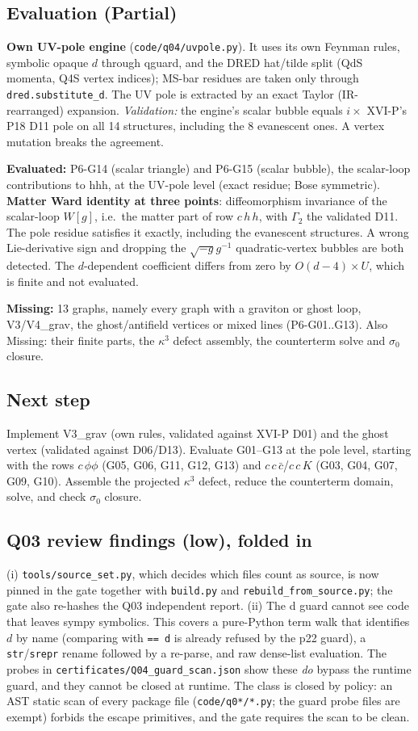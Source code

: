 \subsection{Evaluation (Partial)}
\textbf{Own UV-pole engine} (\texttt{code/q04/uvpole.py}). It uses its own Feynman rules, symbolic opaque $d$ through
qguard, and the DRED hat/tilde split (QdS momenta, Q4S vertex indices); MS-bar residues are taken only through
\texttt{dred.substitute\_d}. The UV pole is extracted by an exact Taylor (IR-rearranged) expansion.
\emph{Validation:} the engine's scalar bubble equals $i\times$ XVI-P's P18 D11 pole on all 14 structures, including the
8 evanescent ones. A vertex mutation breaks the agreement.

\textbf{Evaluated:} P6-G14 (scalar triangle) and P6-G15 (scalar bubble), the scalar-loop contributions to hhh, at the
UV-pole level (exact residue; Bose symmetric). \textbf{Matter Ward identity at three points}: diffeomorphism invariance
of the scalar-loop $W[g]$, i.e.\ the matter part of row $c\,h\,h$, with $\Gamma_2$ the validated D11. The pole residue
satisfies it exactly, including the evanescent structures. A wrong Lie-derivative sign and dropping the
$\sqrt{-g}g^{-1}$ quadratic-vertex bubbles are both detected. The $d$-dependent coefficient differs from zero by
$O(d-4)\times U$, which is finite and not evaluated.

\textbf{Missing:} 13 graphs, namely every graph with a graviton or ghost loop, V3/V4\_grav, the ghost/antifield vertices
or mixed lines (P6-G01..G13). Also Missing: their finite parts, the $\kappa^3$ defect assembly, the counterterm solve
and $\sigma_0$ closure.

\subsection{Next step}
Implement V3\_grav (own rules, validated against XVI-P D01) and the ghost vertex (validated against D06/D13). Evaluate
G01--G13 at the pole level, starting with the rows $c\,\phi\phi$ (G05, G06, G11, G12, G13) and $c\,c\,\bar c$/$c\,c\,K$
(G03, G04, G07, G09, G10). Assemble the projected $\kappa^3$ defect, reduce the counterterm domain, solve, and check
$\sigma_0$ closure.

\subsection{Q03 review findings (low), folded in}
(i) \texttt{tools/source\_set.py}, which decides which files count as source, is now pinned in the gate together with
\texttt{build.py} and \texttt{rebuild\_from\_source.py}; the gate also re-hashes the Q03 independent report.
(ii) The d guard cannot see code that leaves sympy symbolics. This covers a pure-Python term walk that identifies $d$ by
name (comparing with \texttt{== d} is already refused by the p22 guard), a \texttt{str}/\texttt{srepr} rename followed by
a re-parse, and raw dense-list evaluation. The probes in \texttt{certificates/Q04\_guard\_scan.json} show these
\emph{do} bypass the runtime guard, and they cannot be closed at runtime. The class is closed by policy: an AST
static scan of every package file (\texttt{code/q0*/*.py}; the guard probe files are exempt) forbids the escape
primitives, and the gate requires the scan to be clean.
